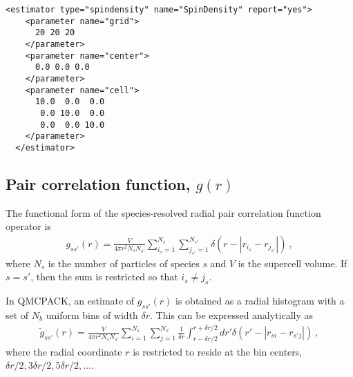 \begin{lstlisting}[style=QMCPXML,caption=Spin density estimator (uniform grid centered about origin).]
  <estimator type="spindensity" name="SpinDensity" report="yes">
    <parameter name="grid">
      20 20 20
    </parameter>
    <parameter name="center">
      0.0 0.0 0.0
    </parameter>
    <parameter name="cell">
      10.0  0.0  0.0
       0.0 10.0  0.0
       0.0  0.0 10.0
    </parameter>
  </estimator>
\end{lstlisting}
   


\subsection{Pair correlation function, $g(r)$}

The functional form of the species-resolved radial pair correlation function operator is
\begin{align}
  g_{ss'}(r) = \frac{V}{4\pi r^2N_sN_{s'}}\sum_{i_s=1}^{N_s}\sum_{j_{s'}=1}^{N_{s'}}\delta(r-|r_{i_s}-r_{j_{s'}}|)\:,
\end{align}
where $N_s$ is the number of particles of species $s$ and $V$ is the supercell volume.  If $s=s'$, then the sum is restricted so that $i_s\ne j_s$.

In QMCPACK, an estimate of $g_{ss'}(r)$ is obtained as a radial histogram with a set of $N_b$ uniform bins of width $\delta r$.  This can be expressed analytically as
\begin{align}
  \tilde{g}_{ss'}(r) = \frac{V}{4\pi r^2N_sN_{s'}}\sum_{i=1}^{N_s}\sum_{j=1}^{N_{s'}}\frac{1}{\delta r}\int_{r-\delta r/2}^{r+\delta r/2}dr'\delta(r'-|r_{si}-r_{s'j}|)\:,
\end{align}
where the radial coordinate $r$ is restricted to reside at the bin centers, $\delta r/2, 3 \delta r/2, 5 \delta r/2, \ldots$.

